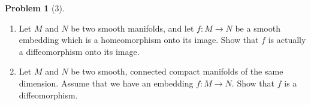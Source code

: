 \documentclass[reqno]{amsart}
\theoremstyle{definition}
\newtheorem{problem}[theorem]{Problem}
\theoremstyle{remark}
\begin{document}
    \begin{problem}[3]
        \begin{enumerate}
            \item Let $M$ and $N$ be two smooth
                manifolds, and let
                $f \colon M \to N$ be a smooth
                embedding which is a homeomorphism
                onto its image. Show that
                $f$ is actually a diffeomorphism onto
                its image.
            \item Let $M$ and $N$ be two smooth,
                connected compact manifolds of the
                same dimension. Assume that we
                have an embedding
                $f \colon M \to N$. Show that
                $f$ is a diffeomorphism.
        \end{enumerate}
    \end{problem}
\end{document}
